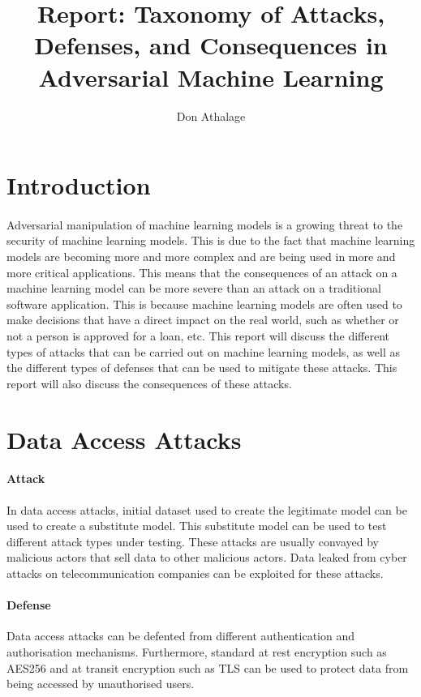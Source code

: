 \documentclass[11pt]{article}
\title{Report: Taxonomy of Attacks, Defenses, and Consequences in Adversarial Machine Learning}
\author{Don Athalage}
\begin{document}
\maketitle

\newpage
\tableofcontents

\newpage



\section{Introduction}
\label{sec:intro}

\paragraph{}{
    Adversarial manipulation of machine learning models is a growing threat to the security of machine learning models. This is due to the fact that machine learning models are becoming more and more complex and are being used in more and more critical applications. This means that the consequences of an attack on a machine learning model can be more severe than an attack on a traditional software application. This is because machine learning models are often used to make decisions that have a direct impact on the real world, such as whether or not a person is approved for a loan, etc. This report will discuss the different types of attacks that can be carried out on machine learning models, as well as the different types of defenses that can be used to mitigate these attacks. This report will also discuss the consequences of these attacks.
}

\section{Data Access Attacks}
\label{sec:data_access}


\paragraph{Attack}{
    In  data access attacks, initial dataset used to create the legitimate model can be used to create a substitute model. This substitute model can be used to test different attack types under testing. These attacks are usually convayed by malicious actors that sell data to other malicious actors. Data leaked from cyber attacks on telecommunication companies can be exploited for these attacks.
}

\paragraph{Defense}{
    Data access attacks can be defented from different authentication and authorisation mechanisms. Furthermore, standard at rest encryption such as AES256 and at transit encryption such as TLS can be used to protect data from being accessed by unauthorised users.
}
\end{document}
